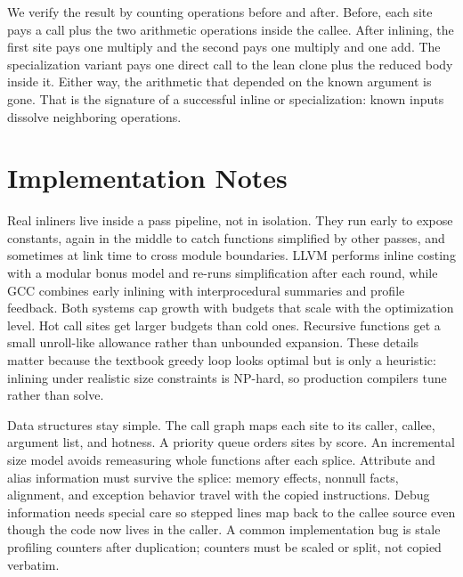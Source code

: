 We verify the result by counting operations before and after.
Before, each site pays a call plus the two arithmetic operations inside the callee.
After inlining, the first site pays one multiply and the second pays one multiply and one add.
The specialization variant pays one direct call to the lean clone plus the reduced body inside it.
Either way, the arithmetic that depended on the known argument is gone.
That is the signature of a successful inline or specialization: known inputs dissolve neighboring operations.

\section{Implementation Notes}\label{sec:ch23-implementation}

Real inliners live inside a pass pipeline, not in isolation.
They run early to expose constants, again in the middle to catch functions simplified by other passes, and sometimes at link time to cross module boundaries.
LLVM performs inline costing with a modular bonus model and re-runs simplification after each round, while GCC combines early inlining with interprocedural summaries and profile feedback.
Both systems cap growth with budgets that scale with the optimization level.
Hot call sites get larger budgets than cold ones.
Recursive functions get a small unroll-like allowance rather than unbounded expansion.
These details matter because the textbook greedy loop looks optimal but is only a heuristic: inlining under realistic size constraints is NP-hard, so production compilers tune rather than solve.

Data structures stay simple.
The call graph maps each site to its caller, callee, argument list, and hotness.
A priority queue orders sites by score.
An incremental size model avoids remeasuring whole functions after each splice.
Attribute and alias information must survive the splice: memory effects, nonnull facts, alignment, and exception behavior travel with the copied instructions.
Debug information needs special care so stepped lines map back to the callee source even though the code now lives in the caller.
A common implementation bug is stale profiling counters after duplication; counters must be scaled or split, not copied verbatim.

